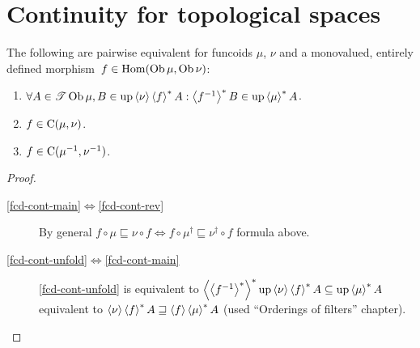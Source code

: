 \section{Continuity for topological spaces}

\begin{prop}
  The following are pairwise equivalent for funcoids $\mu$, $\nu$ and
  a monovalued, entirely defined morphism~$f\in\operatorname{Hom}(\operatorname{Ob}\mu,\operatorname{Ob}\nu)$:
  \begin{enumerate}
    \item\label{fcd-cont-unfold} $\forall A \in \mathscr{T} \operatorname{Ob} \mu, B \in \operatorname{up}
    \left\langle \nu\right\rangle \left\langle f\right\rangle ^{\ast} A : \left\langle f^{- 1}\right\rangle ^{\ast}
    B \in \operatorname{up} \left\langle \mu\right\rangle ^{\ast} A$.

    \item\label{fcd-cont-main}  $f \in \mathrm{C} (\mu, \nu)$.

    \item\label{fcd-cont-rev} $f \in \mathrm{C} (\mu^{- 1} , \nu^{- 1})$.
  \end{enumerate}
\end{prop}

\begin{proof}
  ~
  \begin{description}
  \item[\ref{fcd-cont-main}$\Leftrightarrow$\ref{fcd-cont-rev}] By general $f \circ \mu \sqsubseteq \nu \circ
  f \Leftrightarrow f \circ \mu^{\dagger} \sqsubseteq \nu^{\dagger}
  \circ f$ formula above.

  \item[\ref{fcd-cont-unfold}$\Leftrightarrow$\ref{fcd-cont-main}] \ref{fcd-cont-unfold} is equivalent to
  $\left\langle \left\langle f^{- 1}\right\rangle ^{\ast}\right\rangle ^{\ast}
  \operatorname{up} \left\langle \nu\right\rangle \left\langle f\right\rangle ^{\ast} A \subseteq \operatorname{up}
  \left\langle \mu\right\rangle ^{\ast} A$ equivalent to $\left\langle \nu\right\rangle \left\langle f\right\rangle ^{\ast}
  A \sqsupseteq \left\langle f\right\rangle \left\langle \mu\right\rangle ^{\ast} A$
  (used ``Orderings of filters'' chapter).
  \end{description}
\end{proof}

